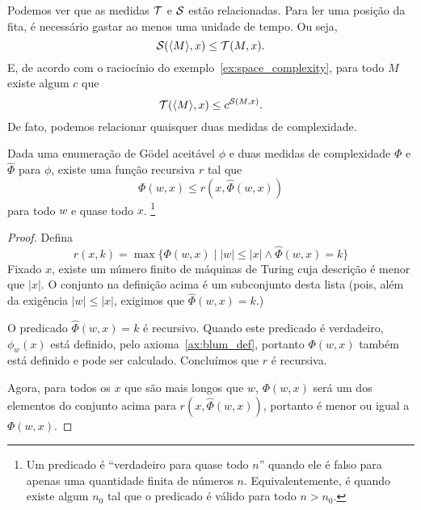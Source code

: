 Podemos ver que as medidas ${\mathcal{T}}$ e ${\mathcal{S}}$ estão relacionadas.
Para ler uma posição da fita,
é necessário gastar ao menos uma unidade de tempo.
Ou seja,
\begin{equation*}
    {\mathcal{S}}(\langle M \rangle, x) \leq {\mathcal{T}}(M, x).
\end{equation*}
E, de acordo com o raciocínio do exemplo~\ref{ex:space_complexity},
para todo $M$ existe algum $c$ que
\begin{equation*}
    {\mathcal{T}}(\langle M \rangle, x) \leq c^{{\mathcal{S}}(M, x)}.
\end{equation*}
De fato, podemos relacionar quaisquer duas medidas de complexidade.

\begin{theorem}
    \label{thm:measure_related}
    Dada uma enumeração de Gödel aceitável $\phi$
    e duas medidas de complexidade $\Phi$ e $\hat \Phi$ para $\phi$,
    existe uma função recursiva $r$ tal que
    \begin{equation*}
        \Phi(w, x) \leq r( x, \hat \Phi(w, x))
    \end{equation*}
    para todo $w$ e quase todo $x$.%
    \footnote{
        Um predicado é ``verdadeiro para quase todo $n$''
        quando ele é falso para apenas uma quantidade finita de números $n$.
        Equivalentemente,
        é quando existe algum $n_0$ tal que
        o predicado é válido para todo $n > n_0$.
    }
\end{theorem}

\begin{proof}
    Defina
    \begin{equation*}
        r( x, k ) = \max \{ \Phi(w, x) \mid |w| \leq |x| \land \hat \Phi(w, x) = k \}
    \end{equation*}
    Fixado $x$, existe um número finito de máquinas de Turing
    cuja descrição é menor que $|x|$.
    O conjunto na definição acima é um subconjunto desta lista
    (pois, além da exigência $|w| \leq |x|$,
    exigimos que $\hat \Phi(w, x) = k$.)

    O predicado $\hat \Phi(w, x) = k$ é recursivo.
    Quando este predicado é verdadeiro,
    $\phi_w(x)$ está definido, pelo axioma~\ref{ax:blum_def},
    portanto $\Phi(w, x)$ também está definido e pode ser calculado.
    Concluímos que $r$ é recursiva.

    Agora, para todos os $x$ que são mais longos que $w$,
    $\Phi(w, x)$ será um dos elementos do conjunto acima
    para $r(x, \hat \Phi(w, x))$,
    portanto é menor ou igual a $\Phi(w, x)$.
\end{proof}

